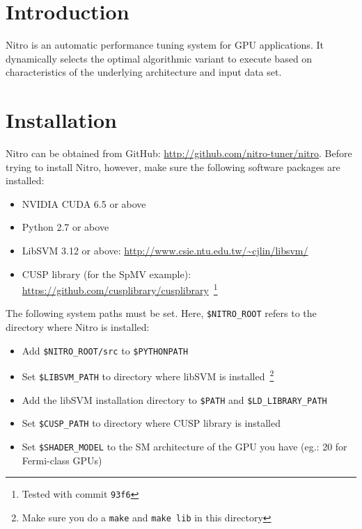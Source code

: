\documentclass[12pt]{article}
\begin{document}
\maketitle

\section{Introduction}
Nitro is an automatic performance tuning system for GPU applications.
It dynamically selects the optimal algorithmic variant to execute based
on characteristics of the underlying architecture and input data set.  

\section{Installation}
Nitro can be obtained from GitHub: \url{http://github.com/nitro-tuner/nitro}.
Before trying to install Nitro, however, make sure the following software packages are installed:

\begin{itemize}
  \item NVIDIA CUDA 6.5 or above
  \item Python 2.7 or above
  \item LibSVM 3.12 or above: \url{http://www.csie.ntu.edu.tw/~cjlin/libsvm/}
  \item CUSP library (for the SpMV example): \url{https://github.com/cusplibrary/cusplibrary}~\footnote{Tested with commit \texttt{93f6}}
\end{itemize}

The following system paths must be set. Here, \texttt{\$NITRO\_ROOT} refers
to the directory where Nitro is installed:

\begin{itemize}
  \item Add \texttt{\$NITRO\_ROOT/src} to \texttt{\$PYTHONPATH}
  \item Set \texttt{\$LIBSVM\_PATH} to directory where libSVM is installed~\footnote{Make sure you do a \texttt{make} and \texttt{make lib} in this directory}
  \item Add the libSVM installation directory to \texttt{\$PATH} and \texttt{\$LD\_LIBRARY\_PATH}
  \item Set \texttt{\$CUSP\_PATH} to directory where CUSP library is installed
  \item Set \texttt{\$SHADER\_MODEL} to the SM architecture of the GPU you have (eg.: 20 for Fermi-class GPUs)
\end{itemize}
\end{document}
